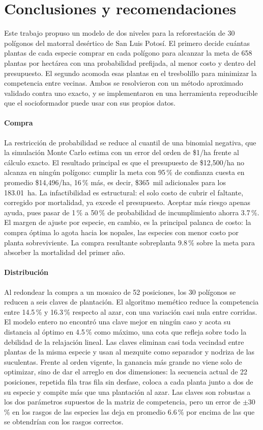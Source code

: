 \section{Conclusiones y recomendaciones}
\label{sec:conclusiones}

Este trabajo propuso un modelo de dos niveles para la reforestación de 30 polígonos del matorral desértico de San Luis Potosí. El primero decide cuántas plantas de cada especie comprar en cada polígono para alcanzar la meta de 658 plantas por hectárea con una probabilidad prefijada, al menor costo y dentro del presupuesto. El segundo acomoda esas plantas en el tresbolillo para minimizar la competencia entre vecinas. Ambos se resolvieron con un método aproximado validado contra uno exacto, y se implementaron en una herramienta reproducible que el socioformador puede usar con sus propios datos.

\paragraph{Compra} La restricción de probabilidad se reduce al cuantil de una binomial negativa, que la simulación Monte Carlo estima con un error del orden de \$1/ha frente al cálculo exacto. El resultado principal es que el presupuesto de \$12{,}500/ha no alcanza en ningún polígono: cumplir la meta con 95\,\% de confianza cuesta en promedio \$14{,}496/ha, 16\,\% más, es decir, \$365~mil adicionales para los 183.01~ha. La infactibilidad es estructural: el solo costo de cubrir el faltante, corregido por mortalidad, ya excede el presupuesto. Aceptar más riesgo apenas ayuda, pues pasar de 1\,\% a 50\,\% de probabilidad de incumplimiento ahorra 3.7\,\%. El margen de ajuste por especie, en cambio, es la principal palanca de costo: la compra óptima lo agota hacia los nopales, las especies con menor costo por planta sobreviviente. La compra resultante sobreplanta 9.8\,\% sobre la meta para absorber la mortalidad del primer año.

\paragraph{Distribución} Al redondear la compra a un mosaico de 52 posiciones, los 30 polígonos se reducen a seis claves de plantación. El algoritmo memético reduce la competencia entre 14.5\,\% y 16.3\,\% respecto al azar, con una variación casi nula entre corridas. El modelo entero no encontró una clave mejor en ningún caso y acota su distancia al óptimo en 4.5\,\% como máximo, una cota que refleja sobre todo la debilidad de la relajación lineal. Las claves eliminan casi toda vecindad entre plantas de la misma especie y usan al mezquite como separador y nodriza de las suculentas. Frente al orden vigente, la ganancia más grande no viene solo de optimizar, sino de dar el arreglo en dos dimensiones: la secuencia actual de 22 posiciones, repetida fila tras fila sin desfase, coloca a cada planta junto a dos de su especie y compite más que una plantación al azar. Las claves son robustas a los dos parámetros supuestos de la matriz de competencia, pero un error de $\pm$30\,\% en los rasgos de las especies las deja en promedio 6.6\,\% por encima de las que se obtendrían con los rasgos correctos.

